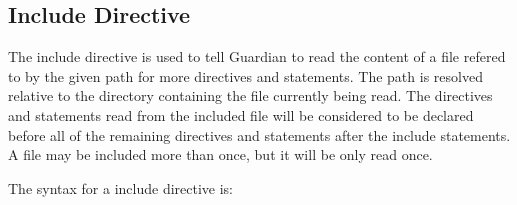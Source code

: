 
\subsection{Include Directive}
{
	The include directive is used to tell Guardian to read the content of
	a file refered to by the given path for more directives and statements.
	The path is resolved
	relative to the directory containing the file currently being read.
	The directives and statements read from the included file will be considered
	to be declared before all of the remaining directives and statements after the
	include statements.
	A file may be included more than once, but it will be only read once.
	
	The syntax for a include directive is:
	\begin{lstlisting}[numbers = none, texcl = true, language = MAIA]
%include: "path/to/file.guard";
	\end{lstlisting}
}
